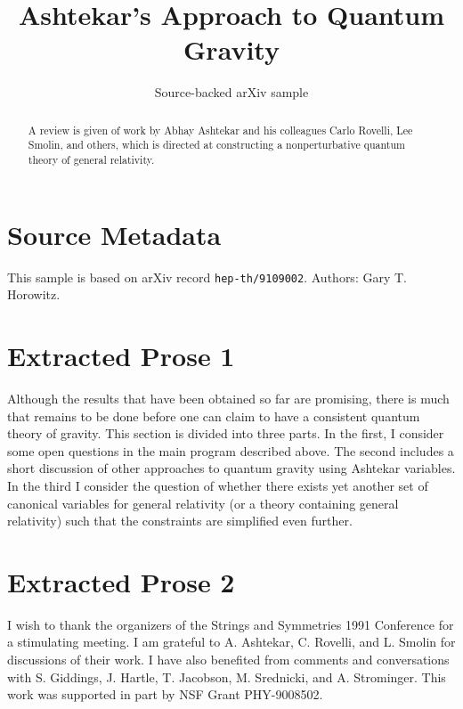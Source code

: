 \documentclass[11pt]{article}
\title{Ashtekar's Approach to Quantum Gravity}
\author{Source-backed arXiv sample}
\date{}
\begin{document}
\maketitle
\begin{abstract}
A review is given of work by Abhay Ashtekar and his colleagues Carlo Rovelli, Lee Smolin, and others, which is directed at constructing a nonperturbative quantum theory of general relativity.
\end{abstract}
\section{Source Metadata}
This sample is based on arXiv record \texttt{hep-th/9109002}. Authors: Gary T. Horowitz.
\section{Extracted Prose 1}
Although the results that have been obtained so far are promising, there is much that remains to be done before one can claim to have a consistent quantum theory of gravity. This section is divided into three parts. In the first, I consider some open questions in the main program described above. The second includes a short discussion of other approaches to quantum gravity using Ashtekar variables. In the third I consider the question of whether there exists yet another set of canonical variables for general relativity (or a theory containing general relativity) such that the constraints are simplified even further.
\section{Extracted Prose 2}
I wish to thank the organizers of the Strings and Symmetries 1991 Conference for a stimulating meeting. I am grateful to A. Ashtekar, C. Rovelli, and L. Smolin for discussions of their work. I have also benefited from comments and conversations with S. Giddings, J. Hartle, T. Jacobson, M. Srednicki, and A. Strominger. This work was supported in part by NSF Grant PHY-9008502.
\end{document}
